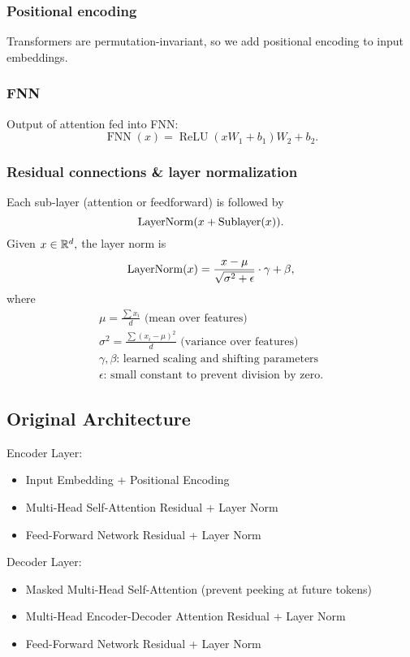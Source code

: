\documentclass[../ds]{subfiles}
\begin{document}
\subsubsection{Positional encoding}
Transformers are permutation-invariant, so we add positional encoding to input embeddings.

\subsubsection{FNN}
Output of attention fed into FNN:
\[ \operatorname{FNN}(x) = \operatorname{ReLU}(xW_1 + b_1)W_2 + b_2. \]

\subsubsection{Residual connections \& layer normalization}
Each sub-layer (attention or feedforward) is followed by
\[ \operatorname{LayerNorm}(x + \operatorname{Sublayer}(x)). \]
Given $x \in \mathbb{R}^d,$ the layer norm is 
\[ \operatorname{LayerNorm}(x) = \frac{x - \mu}{\sqrt{\sigma^2 + \epsilon}} \cdot \gamma + \beta, \]
where
\begin{gather*}
    \mu = \frac{\sum x_i}{d} \text{ (mean over features)}\\
    \sigma^2 = \frac{\sum(x_i - \mu)^2}{d} \text{ (variance over features)}\\
    \gamma,\beta \text{: learned scaling and shifting parameters}\\
    \epsilon \text{: small constant to prevent division by zero}.
\end{gather*}

\subsection{Original Architecture}
Encoder Layer:
\begin{itemize}
    \item Input Embedding + Positional Encoding
    \item Multi-Head Self-Attention \textrightarrow{} Residual + Layer Norm
    \item Feed-Forward Network \textrightarrow{} Residual + Layer Norm
\end{itemize}
Decoder Layer:
\begin{itemize}
\item Masked Multi-Head Self-Attention (prevent peeking at future tokens)
\item Multi-Head Encoder-Decoder Attention \textrightarrow{} Residual + Layer Norm
\item Feed-Forward Network \textrightarrow{} Residual + Layer Norm
\end{itemize}
\end{document}
